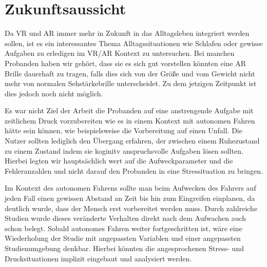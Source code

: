 \section{Zukunftsaussicht}


Da VR und AR immer mehr in Zukunft in das Alltagsleben integriert werden sollen, ist es ein interessantes Thema Alltagssituationen wie Schlafen oder gewisse Aufgaben zu erledigen im VR/AR Kontext zu untersuchen. Bei manchen Probanden haben wir gehört, dass sie es sich gut vorstellen könnten eine AR Brille dauerhaft zu tragen, falls dies sich von der Größe und vom Gewicht nicht mehr von normalen Sehstärkebrille unterscheidet. Zu dem jetzigen Zeitpunkt ist dies jedoch noch nicht möglich.

Es war nicht Ziel der Arbeit die Probanden auf eine anstrengende Aufgabe mit zeitlichem Druck vorzubereiten wie es in einem Kontext mit autonomen Fahren hätte sein können, wie beispielsweise die Vorbereitung auf einen Unfall. Die Nutzer sollten lediglich den Übergang erfahren, der zwischen einem Ruhezustand zu einem Zustand indem sie koginitv anspruchsvolle Aufgaben lösen sollten. Hierbei legten wir hauptsächlich wert auf die Aufweckparameter und die Fehleranzahlen und nicht darauf den Probanden in eine Stressituation zu bringen.

Im Kontext des autonomen Fahrens sollte man beim Aufwecken des Fahrers auf jeden Fall einen gewissen Abstand an Zeit bis hin zum Eingreifen einplanen, da deutlich wurde, dass der Mensch erst vorbereitet werden muss. Durch zahlreiche Studien wurde dieses veränderte Verhalten direkt nach dem Aufwachen auch schon belegt. Sobald autonomes Fahren weiter fortgeschritten ist, wäre eine Wiederholung der Studie mit angepassten Variablen und einer angepassten Studienumgebung denkbar. Hierbei könnten die angesprochenen Stress- und Drucksituationen implizit eingebaut und analysiert werden.
